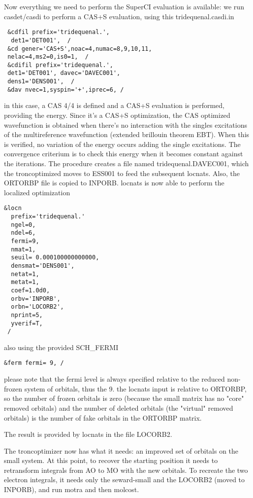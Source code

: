\documentclass[11pt,a4paper]{article}
\begin{document}
Now everything we need to perform the SuperCI evaluation is available: we run
casdet/casdi to perform a CAS+S evaluation, using this tridequenal.casdi.in

\begin{verbatim}
 &cdfil prefix='tridequenal.',
  det1='DET001',  /
 &cd gener='CAS+S',noac=4,numac=8,9,10,11,
 nelac=4,ms2=0,is0=1,  /
 &cdifil prefix='tridequenal.',
 det1='DET001', davec='DAVEC001',
 dens1='DENS001',  /
 &dav nvec=1,syspin='+',iprec=6, /
\end{verbatim}

in this case, a CAS 4/4 is defined and a CAS+S evaluation is performed,
providing the energy. Since it's a CAS+S optimization, the CAS optimized
wavefunction is obtained when there's no interaction with the singles
excitations of the multireference wavefunction (extended brillouin theorem
EBT).
When this is verified, no variation of the energy occurs adding the single
excitations. The convergence criterium is to check this energy when it
becomes constant against the iterations.
The procedure creates a file named tridequenal.DAVEC001, which the
troncoptimized moves to ESS001 to feed the subsequent locnats. Also, the
ORTORBP file is copied to INPORB.
locnats is now able to perform the localized optimization

\begin{verbatim}
&locn
  prefix='tridequenal.'
  ngel=0,
  ndel=6,
  fermi=9,
  nmat=1,
  seuil= 0.000100000000000,
  densmat='DENS001',
  netat=1,
  metat=1,
  coef=1.0d0,
  orbv='INPORB',
  orbn='LOCORB2',
  nprint=5,
  yverif=T,
 /
\end{verbatim}

also using the provided SCH\_FERMI

\begin{verbatim}
&ferm fermi= 9, /
\end{verbatim}

please note that the fermi level is always specified relative to the reduced
non-frozen system of orbitals, thus the 9.
the locnats input is relative to ORTORBP, so the number of frozen orbitals
is zero (because the small matrix has no "core" removed orbitals) and the
number of deleted orbitals (the "virtual" removed orbitals) is the number of
fake orbitals in the ORTORBP matrix.

The result is provided by locnats in the file LOCORB2.

The troncoptimizer now has what it needs: an improved set of orbitals on the
small system. At this point, to recover the starting position it needs to
retransform integrals from AO to MO with the new orbitals. To recreate the
two electron integrals, it needs only the seward-small and the LOCORB2
(moved to INPORB), and run motra and then molcost.
\end{document}
